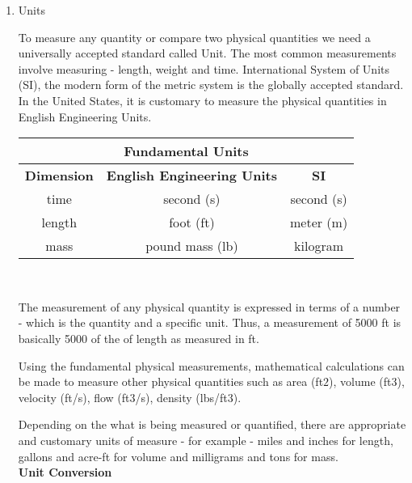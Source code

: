 \documentclass{article}
\begin{document}
\begin{enumerate}
\item Units

To measure any quantity or compare two physical quantities we need a universally accepted standard called Unit. The most common measurements involve measuring - length, weight and time.   International System of Units (SI), the modern form of the metric system is the globally accepted standard.  In the United States, it is customary to measure the physical quantities in English Engineering Units.\\
\vspace{0.5cm}
\begin{tabular}{c c c }
\hline
\multicolumn{3}{c}{\textbf{Fundamental Units}} \\
\hline
\textbf{Dimension} & \textbf{English Engineering Units} & \textbf{SI}\\
\hline
time & second (s) & second (s) \\
length & foot (ft) & meter (m)\\
mass & pound mass (lb) & kilogram\\
\end{tabular}\\

\vspace{0.5cm}

The measurement of any physical quantity is expressed in terms of a number - which is the quantity and a specific unit.  
Thus, a measurement of 5000 ft is basically 5000 of the of length as measured in ft.

Using the fundamental physical measurements, mathematical calculations can be made to measure other physical quantities such as area (ft$2$), volume (ft$3$), velocity (ft/s), flow (ft$3$/s), density (lbs/ft$3$).

Depending on the what is being measured or quantified, there are appropriate and customary units of measure - for example - miles and inches for length, gallons and acre-ft for volume and milligrams and tons for mass.\\
\textbf{Unit Conversion}\\



\end{enumerate}
\end{document}
